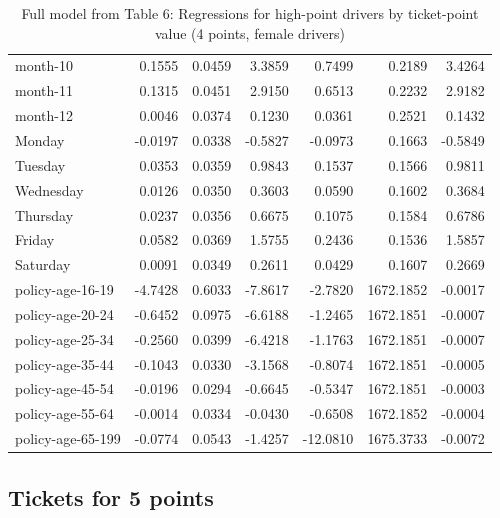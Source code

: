 \documentclass[10pt]{article}
\begin{document}
\begin{table}[ht]
\begin{tabular}{lrrrrrr}
  month-10 & 0.1555 & 0.0459 & 3.3859 & 0.7499 & 0.2189 & 3.4264 \\ 
  month-11 & 0.1315 & 0.0451 & 2.9150 & 0.6513 & 0.2232 & 2.9182 \\ 
  month-12 & 0.0046 & 0.0374 & 0.1230 & 0.0361 & 0.2521 & 0.1432 \\ 
  Monday & -0.0197 & 0.0338 & -0.5827 & -0.0973 & 0.1663 & -0.5849 \\ 
  Tuesday & 0.0353 & 0.0359 & 0.9843 & 0.1537 & 0.1566 & 0.9811 \\ 
  Wednesday & 0.0126 & 0.0350 & 0.3603 & 0.0590 & 0.1602 & 0.3684 \\ 
  Thursday & 0.0237 & 0.0356 & 0.6675 & 0.1075 & 0.1584 & 0.6786 \\ 
  Friday & 0.0582 & 0.0369 & 1.5755 & 0.2436 & 0.1536 & 1.5857 \\ 
  Saturday & 0.0091 & 0.0349 & 0.2611 & 0.0429 & 0.1607 & 0.2669 \\ 
  policy-age-16-19 & -4.7428 & 0.6033 & -7.8617 & -2.7820 & 1672.1852 & -0.0017 \\ 
  policy-age-20-24 & -0.6452 & 0.0975 & -6.6188 & -1.2465 & 1672.1851 & -0.0007 \\ 
  policy-age-25-34 & -0.2560 & 0.0399 & -6.4218 & -1.1763 & 1672.1851 & -0.0007 \\ 
  policy-age-35-44 & -0.1043 & 0.0330 & -3.1568 & -0.8074 & 1672.1851 & -0.0005 \\ 
  policy-age-45-54 & -0.0196 & 0.0294 & -0.6645 & -0.5347 & 1672.1851 & -0.0003 \\ 
  policy-age-55-64 & -0.0014 & 0.0334 & -0.0430 & -0.6508 & 1672.1852 & -0.0004 \\ 
  policy-age-65-199 & -0.0774 & 0.0543 & -1.4257 & -12.0810 & 1675.3733 & -0.0072 \\ 
   \hline
\end{tabular}
\caption{Full model from Table 6: Regressions for high-point drivers by ticket-point value (4 points, female drivers)} 
\label{tab_6_4_pts_F}
\end{table}


\clearpage
\pagebreak




\subsection{Tickets for 5 points}
\end{document}
